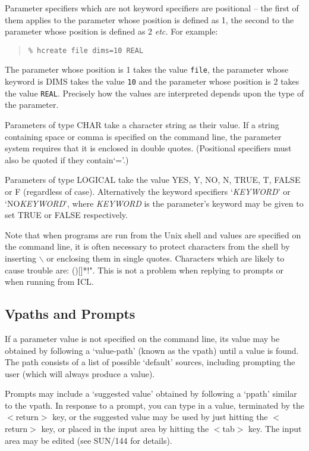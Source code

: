 \documentclass[twoside,11pt]{article}
\newcommand{\xref}[3]{#1}
\renewcommand{\_}{\texttt{\symbol{95}}}
\begin{document}
Parameter specifiers which are not keyword specifiers are positional -- the
first of them applies to the parameter whose position is defined as 1,
the second to the parameter whose position is defined as 2 \textit{etc.}
For example:
\begin{quote}
\texttt{\% hcreate file dims=10 \_REAL}
\end{quote}
The parameter whose position is 1 takes the value \texttt{file}, the parameter
whose keyword is DIMS takes the value \texttt{10} and the parameter whose
position is 2 takes the value \texttt{\_REAL}. Precisely how the values are
interpreted depends upon the type of the parameter.

Parameters of type \_CHAR take a character string as their value. If a string
containing space or comma is specified on the command line, the parameter
system requires that it is enclosed in double quotes. (Positional specifiers
must also be quoted if they contain`='.)

Parameters of type \_LOGICAL take the value YES, Y, NO, N, TRUE, T, FALSE or F
(regardless of case). Alternatively the keyword specifiers `\textit{KEYWORD}'
or `NO\textit{KEYWORD}', where \textit{KEYWORD} is the parameter's keyword
may be given to set TRUE or FALSE respectively.

Note that when programs are run from the Unix shell and values are specified
on the command line, it is often necessary to protect characters from the
shell by inserting $\backslash$ or enclosing them in single quotes.
Characters which are likely to cause trouble are: ()[]*!".
This is not a problem when replying to prompts or when running from ICL.

\subsection{Vpaths and Prompts}
If a parameter value is not specified on the command line, its value may be
obtained by following a `value-path' (known as the vpath) until a value is
found. The path consists of a list of possible `default' sources, including
prompting the user (which will always produce a value).

Prompts may include a `suggested value' obtained by
following a `ppath' similar to the vpath.
In response to a prompt, you can type in a value, terminated by the
$<$return$>$ key, or the suggested value may be used by just
hitting the $<$return$>$ key, or placed in the input area by hitting the
$<$tab$>$
key. The input area may be edited (see
\xref{SUN/144}{sun144}{input_line_editing}
for details).
\end{document}
